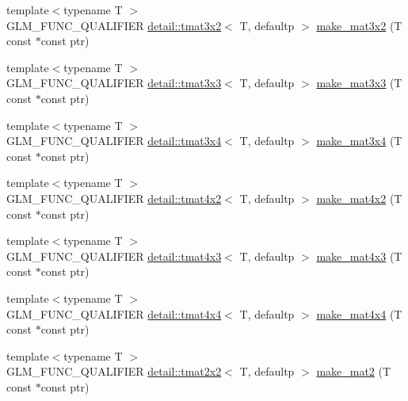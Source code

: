 \begin{DoxyCompactItemize}
\item 
{\footnotesize template$<$typename T $>$ }\\G\+L\+M\+\_\+\+F\+U\+N\+C\+\_\+\+Q\+U\+A\+L\+I\+F\+I\+ER \hyperlink{structglm_1_1detail_1_1tmat3x2}{detail\+::tmat3x2}$<$ T, defaultp $>$ \hyperlink{group__gtc__type__ptr_gaa40868af4de8c5ed5470fdcc9985dbfc}{make\+\_\+mat3x2} (T const $\ast$const ptr)
\item 
{\footnotesize template$<$typename T $>$ }\\G\+L\+M\+\_\+\+F\+U\+N\+C\+\_\+\+Q\+U\+A\+L\+I\+F\+I\+ER \hyperlink{structglm_1_1detail_1_1tmat3x3}{detail\+::tmat3x3}$<$ T, defaultp $>$ \hyperlink{group__gtc__type__ptr_gaf8ba0a0a523423ae1149a1c2d90eb337}{make\+\_\+mat3x3} (T const $\ast$const ptr)
\item 
{\footnotesize template$<$typename T $>$ }\\G\+L\+M\+\_\+\+F\+U\+N\+C\+\_\+\+Q\+U\+A\+L\+I\+F\+I\+ER \hyperlink{structglm_1_1detail_1_1tmat3x4}{detail\+::tmat3x4}$<$ T, defaultp $>$ \hyperlink{group__gtc__type__ptr_gaa0c07ac459a5e16374aa12e3b35ee043}{make\+\_\+mat3x4} (T const $\ast$const ptr)
\item 
{\footnotesize template$<$typename T $>$ }\\G\+L\+M\+\_\+\+F\+U\+N\+C\+\_\+\+Q\+U\+A\+L\+I\+F\+I\+ER \hyperlink{structglm_1_1detail_1_1tmat4x2}{detail\+::tmat4x2}$<$ T, defaultp $>$ \hyperlink{group__gtc__type__ptr_gae4ad99adfe4fb195a192712a71de901d}{make\+\_\+mat4x2} (T const $\ast$const ptr)
\item 
{\footnotesize template$<$typename T $>$ }\\G\+L\+M\+\_\+\+F\+U\+N\+C\+\_\+\+Q\+U\+A\+L\+I\+F\+I\+ER \hyperlink{structglm_1_1detail_1_1tmat4x3}{detail\+::tmat4x3}$<$ T, defaultp $>$ \hyperlink{group__gtc__type__ptr_ga37ec66362c22d86ad2ee11930b638c4a}{make\+\_\+mat4x3} (T const $\ast$const ptr)
\item 
{\footnotesize template$<$typename T $>$ }\\G\+L\+M\+\_\+\+F\+U\+N\+C\+\_\+\+Q\+U\+A\+L\+I\+F\+I\+ER \hyperlink{structglm_1_1detail_1_1tmat4x4}{detail\+::tmat4x4}$<$ T, defaultp $>$ \hyperlink{group__gtc__type__ptr_ga4b13ff6840a66d032724a9a1db50f704}{make\+\_\+mat4x4} (T const $\ast$const ptr)
\item 
{\footnotesize template$<$typename T $>$ }\\G\+L\+M\+\_\+\+F\+U\+N\+C\+\_\+\+Q\+U\+A\+L\+I\+F\+I\+ER \hyperlink{structglm_1_1detail_1_1tmat2x2}{detail\+::tmat2x2}$<$ T, defaultp $>$ \hyperlink{group__gtc__type__ptr_ga903422b2c346cbaccad3153a5a1f404c}{make\+\_\+mat2} (T const $\ast$const ptr)

\end{DoxyCompactItemize}
